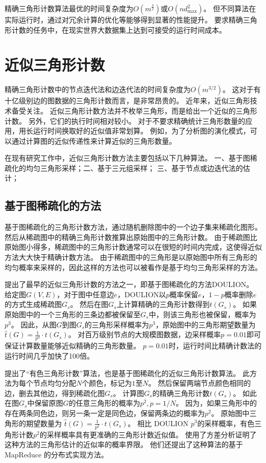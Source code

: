 精确三角形计数算法最优的时间复杂度为$O(m^{\frac{3}{2}})$或$O(nd^{2}_{\max})$。
但不同算法在实际运行时，通过对冗余计算的优化等能够得到显著的性能提升。
要求精确三角形计数的任务中，在现实世界大数据集上达到可接受的运行时间成本。

\chapter{近似三角形计数}

精确三角形计数中的节点迭代法和边迭代法的时间复杂度为$O(m^{3/2})$。
这对于有十亿级别边的图数据的三角形计数而言，是非常昂贵的。
近年来，近似三角形技术备受关注。
近似三角形计数方法并不枚举三角形，而是给出一个近似的三角形计数。
另外，它们的执行时间相对较小。
对于不要求精确统计三角形数量的应用，用长运行时间换取好的近似值非常划算。
例如，为了分析图的演化模式，可以通过计算图的近似传递性来计算近似的三角形数量。

在现有研究工作中，近似三角形计数方法主要包括以下几种算法。
一、基于图稀疏化的均匀三角形采样；二、基于三元组采样；
三、基于节点或边迭代法的估计；

\section{基于图稀疏化的方法}

基于图稀疏化的三角形计数方法，通过随机删除图中的一个边子集来稀疏化图形。
然后从稀疏图中的精确三角形计数推算出原始图中的三角形计数。
由于稀疏图比原始图小得多，稀疏图中的三角形计数通常可以在很短的时间内完成，这使得近似方法大大快于精确计数方法。
由于稀疏图中的三角形是以原始图中所有三角形的均匀概率来采样的，因此这样的方法也可以被看作是基于均匀三角形采样的方法。

\cite{tsourakakis2009doulion}提出了最早的近似三角形计数的方法之一，即基于图稀疏化的方法DOULION。
给定图$G(V,E)$，对于图中任意边$e$，DOULION以$p$概率保留$e$，$1-p$概率删除$e$的方式生成稀疏图$G_s$。
然后在图$G_s$上计算精确的三角形计数得到$t(G_s)$。
如果原始图中的一个三角形的三条边都被保留至$G_s$中，则该三角形也被保留，概率为$p^3$。
因此，从图$G$到图$G_s$的三角形采样概率为$p^3$，原始图中的三角形期望数量为
$\hat{t}(G)=\frac{1}{p^3}\cdot t(G_s) $。
对百万级别节点的大规模图数据，边采样概率$p=0.01$即可保证计算数量能够近似精确的三角形数量。
$p=0.01$时，运行时间比精确计数法的运行时间几乎加快了100倍。

\cite{pagh2012colorful}提出了``有色三角形计数''算法，也是基于图稀疏化的近似三角形计数算法。
此方法为每个节点均匀分配$N$个颜色，标记为$1$至$N$。
然后保留两端节点颜色相同的边，删去其他边，得到稀疏化图$G_s$。
计算图$G_s$的精确三角形计数$t(G_s)$。
如此在图$G_s$中保留原图$G$的任意三角形的概率为$p^2,p=1/N$。
因为，如果三角形中的存在两条同色边，则另一条一定是同色边，保留两条边的概率为$p^2$。
原始图中三角形的期望数量为
$\hat{t}(G)=\frac{1}{p^2}\cdot t(G_s) $。
相比 DOULION $p^3$的采样概率，有色三角形计数$p^2$的采样概率具有更准确的三角形计数近似值。
\cite{pagh2012colorful}使用了方差分析证明了这种方法的三角形估计的近似率的概率界限。
他们还提出了这种算法的基于 MapReduce 的分布式实现方法。

